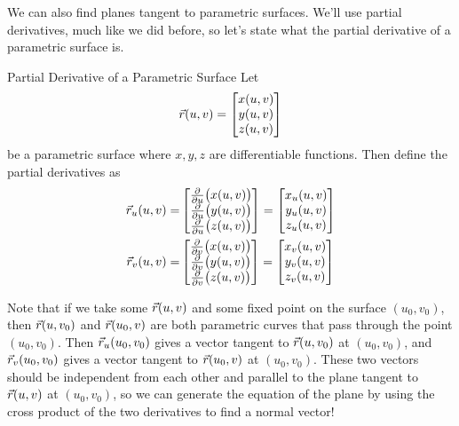 We can also find planes tangent to parametric surfaces. We'll use partial derivatives, much like we did before, so let's state what the partial derivative of a parametric surface is.

\begin{definition}{Partial Derivative of a Parametric Surface}
Let $$\vec{r}(u,v)=\begin{bmatrix}x(u,v)\\y(u,v)\\z(u,v)\end{bmatrix}$$ be a parametric surface where $x,y,z$ are differentiable functions. Then define the partial derivatives as \begin{align*}
\vec{r}_u(u,v)=&\begin{bmatrix}\frac{\partial}{\partial u}\big(x(u,v)\big)\\\frac{\partial}{\partial u}\big(y(u,v)\big)\\\frac{\partial}{\partial u}\big(z(u,v)\big)\end{bmatrix}=\begin{bmatrix}x_u(u,v)\\y_u(u,v)\\z_u(u,v)\end{bmatrix}\\
\vec{r}_v(u,v)=&\begin{bmatrix}\frac{\partial}{\partial v}\big(x(u,v)\big)\\\frac{\partial}{\partial v}\big(y(u,v)\big)\\\frac{\partial}{\partial v}\big(z(u,v)\big)\end{bmatrix}=\begin{bmatrix}x_v(u,v)\\y_v(u,v)\\z_v(u,v)\end{bmatrix}
\end{align*}
\end{definition}

Note that if we take some $\vec{r}(u,v)$ and some fixed point on the surface $(u_0,v_0)$, then $\vec{r}(u,v_0)$ and $\vec{r}(u_0,v)$ are both parametric curves that pass through the point $(u_0,v_0)$. Then $\vec{r}_u(u_0,v_0)$ gives a vector tangent to $\vec{r}(u,v_0)$ at $(u_0,v_0)$, and $\vec{r}_v(u_0,v_0)$ gives a vector tangent to $\vec{r}(u_0,v)$ at $(u_0,v_0)$. These two vectors should be independent from each other and parallel to the plane tangent to $\vec{r}(u,v)$ at $(u_0,v_0)$, so we can generate the equation of the plane by using the cross product of the two derivatives to find a normal vector!

